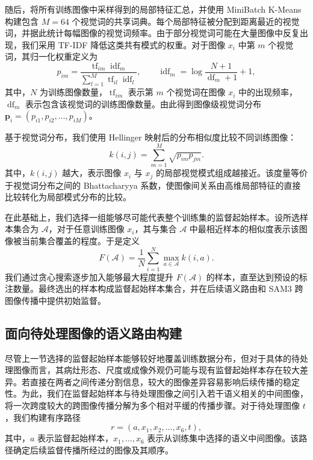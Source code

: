\documentclass[UTF8,a4paper,10pt,twocolumn]{ctexart}
\begin{document}
随后，将所有训练图像中采样得到的局部特征汇总，并使用 MiniBatch K-Means 构建包含 $M=64$ 个视觉词的共享词典。每个局部特征被分配到距离最近的视觉词，并据此统计每幅图像的视觉词频率。由于部分视觉词可能在大量图像中反复出现，我们采用 TF-IDF 降低这类共有模式的权重。对于图像 $x_i$ 中第 $m$ 个视觉词，其归一化权重定义为
\begin{equation}
p_{im}
=
\frac{
\operatorname{tf}_{im}\operatorname{idf}_{m}
}{
\sum_{l=1}^{M}
\operatorname{tf}_{il}\operatorname{idf}_{l}
},
\qquad
\operatorname{idf}_{m}
=
\log\frac{N+1}{\operatorname{df}_{m}+1}+1,
\end{equation}
其中，$N$ 为训练图像数量，$\operatorname{tf}_{im}$ 表示第 $m$ 个视觉词在图像 $x_i$ 中的出现频率，$\operatorname{df}_{m}$ 表示包含该视觉词的训练图像数量。由此得到图像级视觉词分布
$\mathbf{p}_i=(p_{i1},p_{i2},\ldots,p_{iM})$。

基于视觉词分布，我们使用 Hellinger 映射后的分布相似度比较不同训练图像：
\begin{equation}
k(i,j)
=
\sum_{m=1}^{M}
\sqrt{p_{im}p_{jm}}.
\end{equation}
其中，$k(i,j)$ 越大，表示图像 $x_i$ 与 $x_j$ 的局部视觉模式组成越接近。该度量等价于视觉词分布之间的 Bhattacharyya 系数，使图像间关系由高维局部特征的直接比较转化为局部模式分布的比较。

在此基础上，我们选择一组能够尽可能代表整个训练集的监督起始样本。设所选样本集合为 $\mathcal{A}$，对于任意训练图像 $x_i$，其与集合 $\mathcal{A}$ 中最相近样本的相似度表示该图像被当前集合覆盖的程度。于是定义
\begin{equation}
F(\mathcal{A})
=
\frac{1}{N}
\sum_{i=1}^{N}
\max_{a\in\mathcal{A}}
k(i,a).
\end{equation}
我们通过贪心搜索逐步加入能够最大程度提升 $F(\mathcal{A})$ 的样本，直至达到预设的标注数量。最终选出的样本构成监督起始样本集合，并在后续语义路由和 SAM3 跨图像传播中提供初始监督。











\subsection{面向待处理图像的语义路由构建}
\label{sec:semantic-routing}

尽管上一节选择的监督起始样本能够较好地覆盖训练数据分布，但对于具体的待处理图像而言，其病灶形态、尺度或成像外观仍可能与现有监督起始样本存在较大差异。若直接在两者之间传递分割信息，较大的图像差异容易影响后续传播的稳定性。为此，我们在监督起始样本与待处理图像之间引入若干语义相关的中间图像，将一次跨度较大的跨图像传播分解为多个相对平缓的传播步骤。对于待处理图像 $t$，我们构建有序路径
\begin{equation}
r=(a,x_1,x_2,\ldots,x_6,t),
\end{equation}
其中，$a$ 表示监督起始样本，$x_1,\ldots,x_6$ 表示从训练集中选择的语义中间图像。该路径确定后续监督传播所经过的图像及其顺序。
\end{document}
